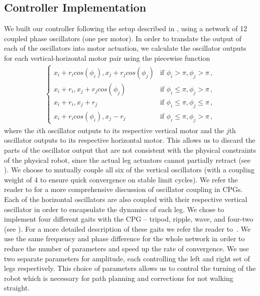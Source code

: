 \subsection{Controller Implementation}
	We built our controller following the setup described in , using a network of 12 coupled phase oscillators (one per motor).
	In order to translate the output of each of the oscillators into motor actuation, we calculate the oscillator outputs for each vertical-horizontal motor pair using the piecewise function
	\begin{align}
		    \begin{cases}
			    x_{i} + r_{i}cos(\phi_{i}), x_{j} + r_{j}cos(\phi_{j}) &\text{if }\phi_{i}>\pi,\phi_{j}>\pi\,,\\
			    x_{i} + r_{i}, x_{j} + r_{j}cos(\phi_{j}) &\text{if }\phi_{i}\leq\pi,\phi_{j}>\pi\,,\\
			    x_{i} + r_{i}, x_{j} + r_{j} &\text{if }\phi_{i}\leq\pi,\phi_{j}\leq\pi\,,\\
			    x_{i} + r_{i}cos(\phi_{i}), x_{j} - r_{j} &\text{if }\phi_{i}\leq\pi,\phi_{j}>\pi\,,
		    \end{cases}
	\end{align}
	where the $i$th oscillator outputs to its respective vertical motor and the $j$th oscillator outputs to its respective horizontal motor. 
	This allows us to discard the parts of the oscillator output that are not consistent with the physical constraints of the physical robot, since the actual leg actuators cannot partially retract (see ).
	We choose to mutually couple all six of the vertical oscillators (with a coupling weight of 4 to ensure quick convergence on stable limit cycles).
	We refer the reader to \cite{Crespi_2007} for a more comprehensive discussion of oscillator coupling in CPGs.
	Each of the horizontal oscillators are also coupled with their respective vertical oscillator in order to encapsulate the dynamics of each leg.
	We chose to implement four different gaits with the CPG -- tripod, ripple, wave, and four-two (see ). 
	For a more detailed description of these gaits we refer the reader to~\cite{Campos2010}.
	We use the same frequency and phase difference for the whole network in order to reduce the number of parameters and speed up the rate of convergence.
	We use two separate parameters for amplitude, each controlling the left and right set of legs respectively.
	This choice of parameters allows us to control the turning of the robot which is necessary for path planning and corrections for not walking straight.

